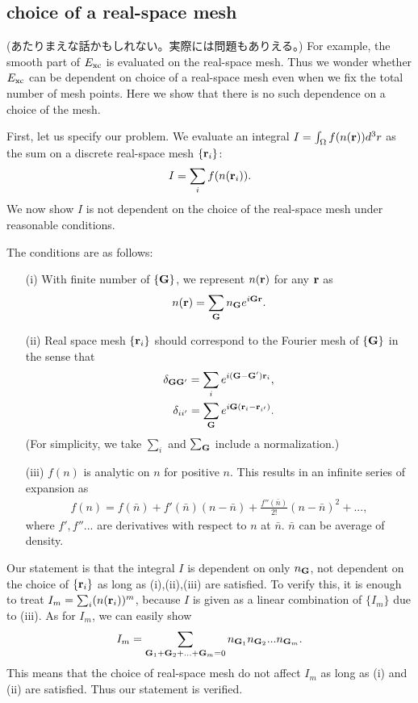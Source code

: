 \documentclass[a4paper,10pt,aip,onecolumn,amsmath,amssymb,floatfix,rmp]{revtex4-1}
\newcommand{\bfr}{{\bf r}}
\newcommand{\bfG}{{\bf G}}
\begin{document}
\subsection{choice of a real-space mesh}
\label{sec:realmesh}
(あたりまえな話かもしれない。実際には問題もありえる。)
For example, the smooth part of $E_{\rm xc}$ is evaluated on
the real-space mesh. Thus we wonder whether $E_{\rm xc}$ can be
dependent on choice of a real-space mesh even when we fix the total
number of mesh points. Here we show that there is no 
such dependence on a choice of the mesh.

First, let us specify our problem. We evaluate an integral 
$I=\int_\Omega f(n(\bfr)) d^3r$ as the sum on a discrete real-space mesh 
$\{\bfr_i\}$:
\begin{eqnarray}
I= \sum_{i} f(n(\bfr_{i})). \label{isum}
\end{eqnarray}
We now show $I$ is not dependent on the choice of the real-space mesh
under reasonable conditions.

The conditions are as follows:
\begin{itemize}
\item[(i)]
With finite number of $\{\bfG\}$, we represent $n(\bfr)$ for any $\bfr$ as
\begin{eqnarray}
n(\bfr)= \sum_{\bfG} n_\bfG e^{i \bfG \bfr}.
\end{eqnarray}
\item[(ii)]
Real space mesh $\{\bfr_{i}\}$ should correspond to the Fourier mesh of
$\{\bfG\}$ in the sense that
\begin{eqnarray}
\delta_{\bfG\bfG'}= \sum_{i} e^{i (\bfG-\bfG') \bfr_{i}},\nonumber \\
\delta_{ii'}= \sum_{\bfG} e^{i \bfG(\bfr_i-\bfr_{i'})}.
\end{eqnarray}
(For simplicity, we take $\sum_i$ and $\sum_\bfG$ include a normalization.)
\item[(iii)]
$f(n)$ is analytic on $n$ for positive $n$. This results in
	   an infinite series of expansion as 
\begin{eqnarray}
f(n)\!=\! f(\bar{n}) 
\!+\! f'(\bar{n}) (n-\bar{n}) \!+\! \frac{f''(\bar{n}) }{2!} (n-\bar{n})^2 \!+\!... , \label{fexpand}
\end{eqnarray}
where $f',f''...$ are derivatives with respect to $n$ at $\bar{n}$.
$\bar{n}$ can be average of density.
\end{itemize}

Our statement is that the integral $I$ is dependent on only $n_\bfG$, not
dependent on the choice of $\{\bfr_i\}$ as long as (i),(ii),(iii) are
satisfied. To verify this, it is enough to treat 
$I_m=\sum_i (n(\bfr_i))^m$, because
$I$ is given as a linear combination of $\{I_m\}$
due to (iii). As for $I_m$, we can easily show
\begin{eqnarray}
I_m = \sum_{\bfG_1+\bfG_2+...+\bfG_m=0} n_{\bfG_1} n_{\bfG_2} ... n_{\bfG_m}.
\end{eqnarray}
This means that the choice of real-space mesh do not affect $I_m$
as long as (i) and (ii) are satisfied. Thus our statement is verified.
\end{document}
